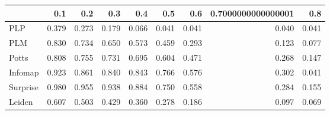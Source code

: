 \begin{tabular}{lrrrrrrrr}
\toprule
{} &   0.1 &   0.2 &   0.3 &   0.4 &   0.5 &   0.6 & 0.7000000000000001 &   0.8 \\
\midrule
PLP      & 0.379 & 0.273 & 0.179 & 0.066 & 0.041 & 0.041 &              0.040 & 0.041 \\
PLM      & 0.830 & 0.734 & 0.650 & 0.573 & 0.459 & 0.293 &              0.123 & 0.077 \\
Potts    & 0.808 & 0.755 & 0.731 & 0.695 & 0.604 & 0.471 &              0.268 & 0.147 \\
Infomap  & 0.923 & 0.861 & 0.840 & 0.843 & 0.766 & 0.576 &              0.302 & 0.041 \\
Surprise & 0.980 & 0.955 & 0.938 & 0.884 & 0.750 & 0.558 &              0.284 & 0.155 \\
Leiden   & 0.607 & 0.503 & 0.429 & 0.360 & 0.278 & 0.186 &              0.097 & 0.069 \\
\bottomrule
\end{tabular}
